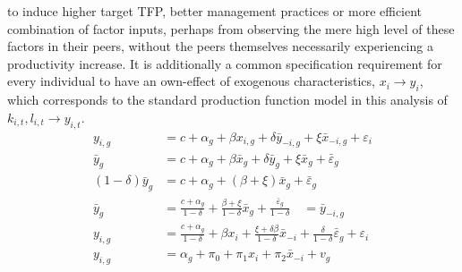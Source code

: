 to induce higher target TFP, better management practices or
more efficient combination of factor inputs, perhaps from observing
the mere high level of these factors in their peers,
without the peers themselves necessarily experiencing a productivity increase.
It is additionally a common specification requirement for every individual
to have an own-effect of exogenous characteristics, $x_i \to y_i$,
which corresponds to the standard production function model in this analysis of
$k_{i,t}, l_{i,t}\to y_{i,t}$.
\begin{align*}
    y_{i,g} &= c + \alpha_g + \beta x_{i,g} + \delta\bar y_{-i,g} + \xi\bar x_{-i,g} + \varepsilon_i
    \\
    \bar y_g &= c + \alpha_g + \beta\bar x_g + \delta\bar y_g + \xi\bar x_g + \bar\varepsilon_g
    \\
    (1-\delta)\bar y_g &= c + \alpha_g + (\beta+\xi)\bar x_g + \bar\varepsilon_g
    \\ \tag{large g assumption}
    \bar y_g &= \frac{c + \alpha_g}{1-\delta} +\frac{\beta+\xi}{1-\delta}\bar x_g+\frac{\bar\varepsilon_g}{1-\delta}
        \quad = \bar y_{-i,g}
    \\ \tag{substituting}
    y_{i,g} &= \frac {c + \alpha_g}{1-\delta} +\beta x_i + \frac{\xi+\delta\beta}{1-\delta}\bar x_{-i}
    + \frac\delta{1-\delta}\bar\varepsilon_g + \varepsilon_i 
    \\
    y_{i,g} &= \alpha_g + \pi_0 + \pi_1x_i + \pi_2 \bar x_{-i} + v_g
\end{align*}

